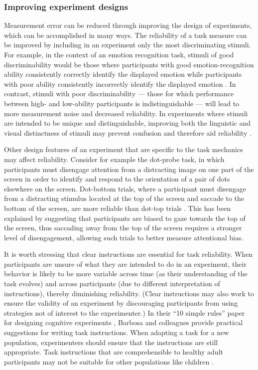 \documentclass[a4paper,12pt]{article}
\begin{document}
\subsubsection{Improving experiment designs}

Measurement error can be reduced through improving the design of experiments, which can be accomplished in many ways. The reliability of a task measure can be improved by including in an experiment only the most discriminating stimuli. For example, in the context of an emotion recognition task, stimuli of good discriminability would be those where participants with good emotion-recognition ability consistently correctly identify the displayed emotion while participants with poor ability consistently incorrectly identify the displayed emotion \cite{keutmann2015generating}. In contrast, stimuli with poor discriminability --- those for which performance between high- and low-ability participants is indistinguishable --- will lead to more measurement noise and decreased reliability. In experiments where stimuli are intended to be unique and distinguishable, improving both the linguistic and visual distinctness of stimuli may prevent confusion and therefore aid reliability \cite{yoo2022importance}.  

Other design features of an experiment that are specific to the task mechanics may affect reliability. Consider for example the dot-probe task, in which participants must disengage attention from a distracting image on one part of the screen in order to identify and respond to the orientation of a pair of dots elsewhere on the screen. Dot-bottom trials, where a participant must disengage from a distracting stimulus located at the top of the screen and saccade to the bottom of the screen, are more reliable than dot-top trials \cite{price2015empirical, aday2019extended}. This has been explained by suggesting that participants are biased to gaze towards the top of the screen, thus saccading away from the top of the screen requires a stronger level of disengagement, allowing such trials to better measure attentional bias. 

It is worth stressing that clear instructions are essential for task reliability. When participants are unsure of what they are intended to do in an experiment, their behavior is likely to be more variable across time (as their understanding of the task evolves) and across participants (due to different interpretation of instructions), thereby diminishing reliability. (Clear instructions may also work to ensure the validity of an experiment by discouraging participants from using strategies not of interest to the experimenter.) In their ``10 simple rules'' paper for designing cognitive experiments \cite{barbosa2022practical}, Barbosa and colleagues provide practical suggestions for writing task instructions. When adapting a task for a new population, experimenters should ensure that the instructions are still appropriate. Task instructions that are comprehensible to healthy adult participants may not be suitable for other populations like children \cite{hughes2002measuring}. 
\end{document}
